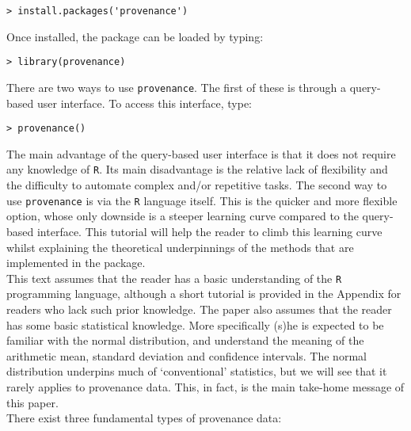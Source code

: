 \documentclass[11pt]{article}
\begin{document}
\begin{verbatim}
> install.packages('provenance')
\end{verbatim}

Once installed, the package can be loaded by typing:

\begin{verbatim}
> library(provenance)
\end{verbatim}

There are two ways to use \texttt{provenance}.  The first of these is
 through a query-based user interface. To access this interface, type:

\begin{verbatim}
> provenance()
\end{verbatim}

The main advantage of the query-based user interface is that it does
not require any knowledge of \texttt{R}. Its main disadvantage is the
relative lack of flexibility and the difficulty to automate complex
and/or repetitive tasks. The second way to use \texttt{provenance} is
via the \texttt{R} language itself. This is the quicker and more
flexible option, whose only downside is a steeper learning curve
compared to the query-based interface. This tutorial will help the
reader to climb this learning curve whilst explaining the theoretical
underpinnings of the methods that are implemented in the package.\\

This text assumes that the reader has a basic understanding of the
\texttt{R} programming language, although a short tutorial is provided
in the Appendix for readers who lack such prior knowledge. The paper
also assumes that the reader has some basic statistical
knowledge. More specifically (s)he is expected to be familiar with the
normal distribution, and understand the meaning of the arithmetic
mean, standard deviation and confidence intervals. The normal
distribution underpins much of `conventional' statistics, but we will
see that it rarely applies to provenance data.  This, in fact, is the
main take-home message of this paper.\\

There exist three fundamental types of provenance data:
\end{document}
